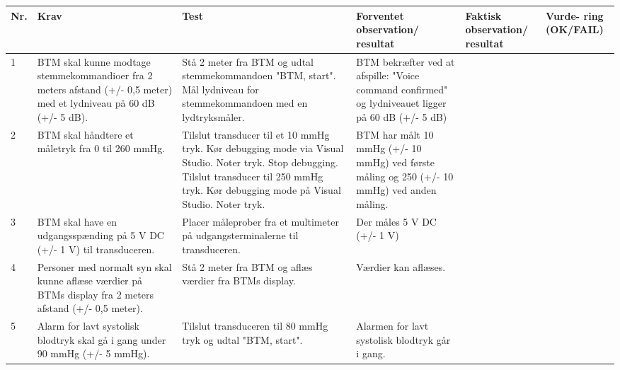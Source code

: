 \begin{table}[H]
\begin{tabular}{|p{0.5cm}|p{4cm}|p{3cm}|p{3cm}|p{3cm}|p{1cm}|}
\hline
\textbf{Nr.} & \textbf{Krav} & \textbf{Test}& \textbf{Forventet observation/ resultat}& \textbf{Faktisk observation/ resultat}& \textbf{Vurde- ring (OK/FAIL)}\\\hline
 1 & BTM skal kunne modtage stemmekommandioer fra 2 meters afstand (+/- 0,5 meter) med et lydniveau på 60 dB (+/- 5 dB). & Stå 2 meter fra BTM og udtal stemmekommandoen "BTM, start". Mål lydniveau for stemmekommandoen med en lydtryksmåler. & BTM bekræfter ved at afspille: "Voice command confirmed" og lydniveauet ligger på 60 dB (+/- 5 dB)&  &  \\\hline
 2 & BTM skal håndtere et måletryk fra 0 til 260 mmHg. & Tilslut transducer til et 10 mmHg tryk. Kør debugging mode via Visual Studio. Noter tryk. Stop debugging. Tilslut transducer til 250 mmHg tryk. Kør debugging mode på Visual Studio. Noter tryk. & BTM har målt 10 mmHg (+/- 10 mmHg) ved første måling og 250 (+/- 10 mmHg) ved anden måling. & & \\\hline
 3 & BTM skal have en udgangsspænding på 5 V DC (+/- 1 V) til transduceren. & Placer måleprober fra et multimeter på udgangsterminalerne til transduceren. & Der måles 5 V DC (+/- 1 V) & &  \\\hline
 4 & Personer med normalt syn skal kunne aflæse værdier på BTMs display fra 2 meters afstand (+/- 0,5 meter). & Stå 2 meter fra BTM og aflæs værdier fra BTMs display. & Værdier kan aflæses. & &  \\\hline
 5 & Alarm for lavt systolisk blodtryk skal gå i gang under 90 mmHg (+/- 5 mmHg).} & Tilslut transduceren til 80 mmHg tryk og udtal "BTM, start". & Alarmen for lavt systolisk blodtryk går i gang. & & \\\hline
\end{tabular}
\end{table}
\newpage
